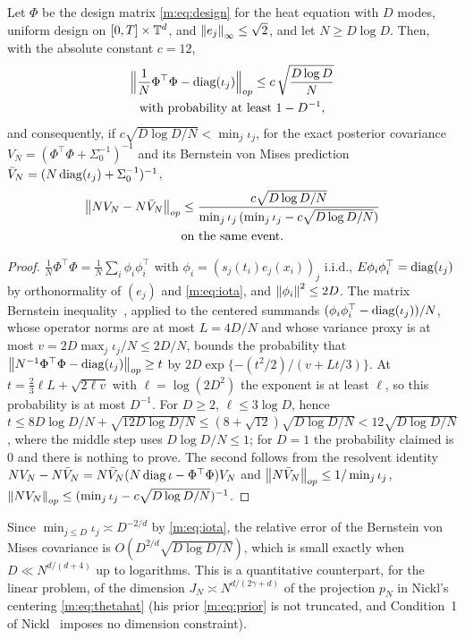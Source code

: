 \begin{proposition}\label{m:prop:gram}
Let $\Phi$ be the design matrix \eqref{m:eq:design} for the heat equation with $D$ modes, uniform design on $[0,T]\times\mathbb{T}^d$, and $\left\|e_j\right\|_\infty\le\sqrt2$, and let $N\ge D\log D$. Then, with the absolute constant $c=12$,
\[
\begin{gathered}
\Big\|\frac1N\Phi^\top\Phi-\operatorname{diag}(\iota_j)\Big\|_{op}\le c\,\sqrt{\frac{D\log D}{N}}\\
\text{with probability at least }1-D^{-1},
\end{gathered}
\]
and consequently, if $c\sqrt{D\log D/N}<\min_j\iota_j$, for the exact posterior covariance $V_N=(\Phi^\top\Phi+\Sigma_0^{-1})^{-1}$ and its Bernstein von Mises prediction $\bar V_N=(N\operatorname{diag}(\iota_j)+\Sigma_0^{-1})^{-1}$,
\[
\begin{gathered}
\left\|NV_N-N\bar V_N\right\|_{op}\le\frac{c\sqrt{D\log D/N}}{\min_j\iota_j\,(\min_j\iota_j-c\sqrt{D\log D/N})}\\
\text{on the same event.}
\end{gathered}
\]
\end{proposition}

\begin{proof}
$\frac1N\Phi^\top\Phi=\frac1N\sum_i\phi_i\phi_i^\top$ with $\phi_i=(s_j(t_i)e_j(x_i))_j$ i.i.d., $E\phi_i\phi_i^\top=\operatorname{diag}(\iota_j)$ by orthonormality of $(e_j)$ and \eqref{m:eq:iota}, and $\left\|\phi_i\right\|^2\le2D$. The matrix Bernstein inequality~\cite[Theorem 6.1.1]{tropp2015}, applied to the centered summands $(\phi_i\phi_i^\top-\operatorname{diag}(\iota_j))/N$, whose operator norms are at most $L=4D/N$ and whose variance proxy is at most $v=2D\max_j\iota_j/N\le2D/N$, bounds the probability that $\left\|N^{-1}\Phi^\top\Phi-\operatorname{diag}(\iota_j)\right\|_{op}\ge t$ by $2D\exp\{-(t^2/2)/(v+Lt/3)\}$. At $t=\frac23\ell L+\sqrt{2\ell v}$ with $\ell=\log(2D^2)$ the exponent is at least $\ell$, so this probability is at most $D^{-1}$. For $D\ge2$, $\ell\le3\log D$, hence $t\le8D\log D/N+\sqrt{12D\log D/N}\le(8+\sqrt{12})\sqrt{D\log D/N}<12\sqrt{D\log D/N}$, where the middle step uses $D\log D/N\le1$; for $D=1$ the probability claimed is $0$ and there is nothing to prove. The second follows from the resolvent identity $NV_N-N\bar V_N=N\bar V_N(N\operatorname{diag}\iota-\Phi^\top\Phi)V_N$ and $\left\|N\bar V_N\right\|_{op}\le1/\min_j\iota_j$, $\left\|NV_N\right\|_{op}\le(\min_j\iota_j-c\sqrt{D\log D/N})^{-1}$.
\end{proof}

Since $\min_{j\le D}\iota_j\asymp D^{-2/d}$ by \eqref{m:eq:iota}, the relative error of the Bernstein von Mises covariance is $O(D^{2/d}\sqrt{D\log D/N})$, which is small exactly when $D\ll N^{d/(d+4)}$ up to logarithms. This is a quantitative counterpart, for the linear problem, of the dimension $J_N\asymp N^{d/(2\gamma+d)}$ of the projection $p_N$ in Nickl's centering \eqref{m:eq:thetahat} (his prior \eqref{m:eq:prior} is not truncated, and Condition~1 of Nickl~\cite{nicklbvm2024} imposes no dimension constraint).

